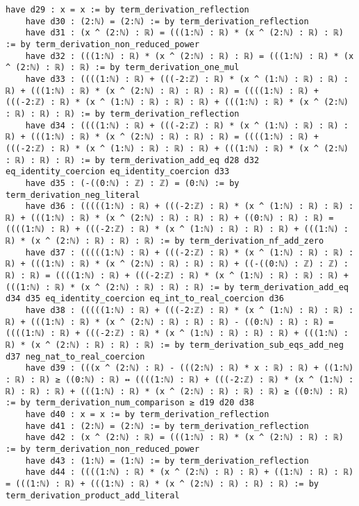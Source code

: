 \documentclass{article}
\begin{document}
\begin{tcolorbox}[colback=white!10, width=\linewidth]
\begin{lstlisting}[language=Lean4]
    have d29 : x = x := by term_derivation_reflection
    have d30 : (2:ℕ) = (2:ℕ) := by term_derivation_reflection
    have d31 : (x ^ (2:ℕ) : ℝ) = (((1:ℕ) : ℝ) * (x ^ (2:ℕ) : ℝ) : ℝ) := by term_derivation_non_reduced_power
    have d32 : (((1:ℕ) : ℝ) * (x ^ (2:ℕ) : ℝ) : ℝ) = (((1:ℕ) : ℝ) * (x ^ (2:ℕ) : ℝ) : ℝ) := by term_derivation_one_mul
    have d33 : ((((1:ℕ) : ℝ) + (((-2:ℤ) : ℝ) * (x ^ (1:ℕ) : ℝ) : ℝ) : ℝ) + (((1:ℕ) : ℝ) * (x ^ (2:ℕ) : ℝ) : ℝ) : ℝ) = ((((1:ℕ) : ℝ) + (((-2:ℤ) : ℝ) * (x ^ (1:ℕ) : ℝ) : ℝ) : ℝ) + (((1:ℕ) : ℝ) * (x ^ (2:ℕ) : ℝ) : ℝ) : ℝ) := by term_derivation_reflection
    have d34 : ((((1:ℕ) : ℝ) + (((-2:ℤ) : ℝ) * (x ^ (1:ℕ) : ℝ) : ℝ) : ℝ) + (((1:ℕ) : ℝ) * (x ^ (2:ℕ) : ℝ) : ℝ) : ℝ) = ((((1:ℕ) : ℝ) + (((-2:ℤ) : ℝ) * (x ^ (1:ℕ) : ℝ) : ℝ) : ℝ) + (((1:ℕ) : ℝ) * (x ^ (2:ℕ) : ℝ) : ℝ) : ℝ) := by term_derivation_add_eq d28 d32 eq_identity_coercion eq_identity_coercion d33
    have d35 : (-((0:ℕ) : ℤ) : ℤ) = (0:ℕ) := by term_derivation_neg_literal
    have d36 : (((((1:ℕ) : ℝ) + (((-2:ℤ) : ℝ) * (x ^ (1:ℕ) : ℝ) : ℝ) : ℝ) + (((1:ℕ) : ℝ) * (x ^ (2:ℕ) : ℝ) : ℝ) : ℝ) + ((0:ℕ) : ℝ) : ℝ) = ((((1:ℕ) : ℝ) + (((-2:ℤ) : ℝ) * (x ^ (1:ℕ) : ℝ) : ℝ) : ℝ) + (((1:ℕ) : ℝ) * (x ^ (2:ℕ) : ℝ) : ℝ) : ℝ) := by term_derivation_nf_add_zero
    have d37 : (((((1:ℕ) : ℝ) + (((-2:ℤ) : ℝ) * (x ^ (1:ℕ) : ℝ) : ℝ) : ℝ) + (((1:ℕ) : ℝ) * (x ^ (2:ℕ) : ℝ) : ℝ) : ℝ) + ((-((0:ℕ) : ℤ) : ℤ) : ℝ) : ℝ) = ((((1:ℕ) : ℝ) + (((-2:ℤ) : ℝ) * (x ^ (1:ℕ) : ℝ) : ℝ) : ℝ) + (((1:ℕ) : ℝ) * (x ^ (2:ℕ) : ℝ) : ℝ) : ℝ) := by term_derivation_add_eq d34 d35 eq_identity_coercion eq_int_to_real_coercion d36
    have d38 : (((((1:ℕ) : ℝ) + (((-2:ℤ) : ℝ) * (x ^ (1:ℕ) : ℝ) : ℝ) : ℝ) + (((1:ℕ) : ℝ) * (x ^ (2:ℕ) : ℝ) : ℝ) : ℝ) - ((0:ℕ) : ℝ) : ℝ) = ((((1:ℕ) : ℝ) + (((-2:ℤ) : ℝ) * (x ^ (1:ℕ) : ℝ) : ℝ) : ℝ) + (((1:ℕ) : ℝ) * (x ^ (2:ℕ) : ℝ) : ℝ) : ℝ) := by term_derivation_sub_eqs_add_neg d37 neg_nat_to_real_coercion
    have d39 : (((x ^ (2:ℕ) : ℝ) - (((2:ℕ) : ℝ) * x : ℝ) : ℝ) + ((1:ℕ) : ℝ) : ℝ) ≥ ((0:ℕ) : ℝ) ↔ ((((1:ℕ) : ℝ) + (((-2:ℤ) : ℝ) * (x ^ (1:ℕ) : ℝ) : ℝ) : ℝ) + (((1:ℕ) : ℝ) * (x ^ (2:ℕ) : ℝ) : ℝ) : ℝ) ≥ ((0:ℕ) : ℝ) := by term_derivation_num_comparison ≥ d19 d20 d38
    have d40 : x = x := by term_derivation_reflection
    have d41 : (2:ℕ) = (2:ℕ) := by term_derivation_reflection
    have d42 : (x ^ (2:ℕ) : ℝ) = (((1:ℕ) : ℝ) * (x ^ (2:ℕ) : ℝ) : ℝ) := by term_derivation_non_reduced_power
    have d43 : (1:ℕ) = (1:ℕ) := by term_derivation_reflection
    have d44 : ((((1:ℕ) : ℝ) * (x ^ (2:ℕ) : ℝ) : ℝ) + ((1:ℕ) : ℝ) : ℝ) = (((1:ℕ) : ℝ) + (((1:ℕ) : ℝ) * (x ^ (2:ℕ) : ℝ) : ℝ) : ℝ) := by term_derivation_product_add_literal

\end{lstlisting}
\end{tcolorbox}
\end{document}
